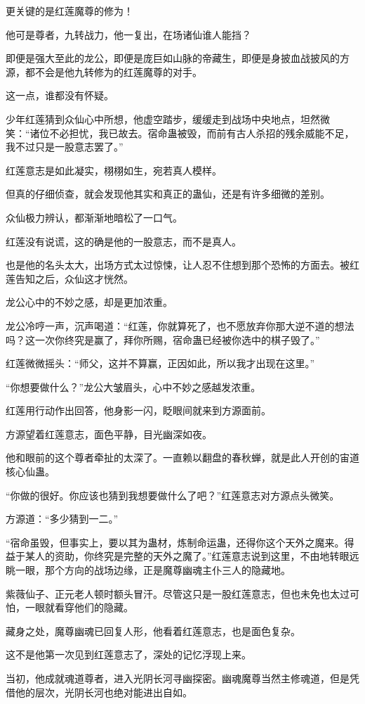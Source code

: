 \begin{this_body}
更关键的是红莲魔尊的修为！

他可是尊者，九转战力，他一复出，在场诸仙谁人能挡？

即便是强大至此的龙公，即便是庞巨如山脉的帝藏生，即便是身披血战披风的方源，都不会是他九转修为的红莲魔尊的对手。

这一点，谁都没有怀疑。

少年红莲猜到众仙心中所想，他虚空踏步，缓缓走到战场中央地点，坦然微笑：“诸位不必担忧，我已故去。宿命蛊被毁，而前有古人杀招的残余威能不足，我不过只是一股意志罢了。”

红莲意志是如此凝实，栩栩如生，宛若真人模样。

但真的仔细侦查，就会发现他其实和真正的蛊仙，还是有许多细微的差别。

众仙极力辨认，都渐渐地暗松了一口气。

红莲没有说谎，这的确是他的一股意志，而不是真人。

也是他的名头太大，出场方式太过惊悚，让人忍不住想到那个恐怖的方面去。被红莲告知之后，众仙这才恍然。

龙公心中的不妙之感，却是更加浓重。

龙公冷哼一声，沉声喝道：“红莲，你就算死了，也不愿放弃你那大逆不道的想法吗？这一次你终究是赢了，拜你所赐，宿命蛊已经被你选中的棋子毁了。”

红莲微微摇头：“师父，这并不算赢，正因如此，所以我才出现在这里。”

“你想要做什么？”龙公大皱眉头，心中不妙之感越发浓重。

红莲用行动作出回答，他身影一闪，眨眼间就来到方源面前。

方源望着红莲意志，面色平静，目光幽深如夜。

他和眼前的这个尊者牵扯的太深了。一直赖以翻盘的春秋蝉，就是此人开创的宙道核心仙蛊。

“你做的很好。你应该也猜到我想要做什么了吧？”红莲意志对方源点头微笑。

方源道：“多少猜到一二。”

“宿命虽毁，但事实上，要以其为蛊材，炼制命运蛊，还得你这个天外之魔来。得益于某人的资助，你终究是完整的天外之魔了。”红莲意志说到这里，不由地转眼远眺一眼，那个方向的战场边缘，正是魔尊幽魂主仆三人的隐藏地。

紫薇仙子、正元老人顿时额头冒汗。尽管这只是一股红莲意志，但也未免也太过可怕，一眼就看穿他们的隐藏。

藏身之处，魔尊幽魂已回复人形，他看着红莲意志，也是面色复杂。

这不是他第一次见到红莲意志了，深处的记忆浮现上来。

当初，他成就魂道尊者，进入光阴长河寻幽探密。幽魂魔尊当然主修魂道，但是凭借他的层次，光阴长河也绝对能进出自如。


\end{this_body}
